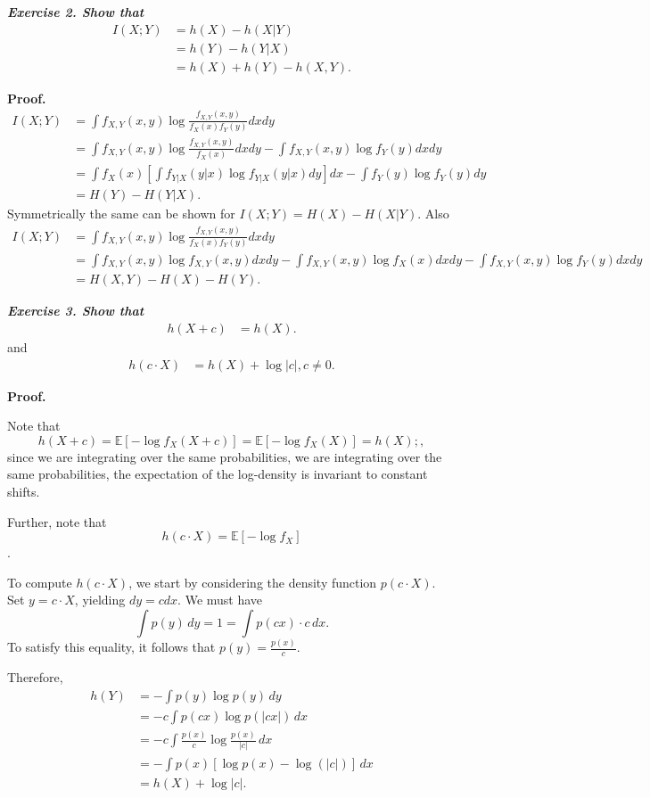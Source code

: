 \documentclass[12pt]{extarticle}
\begin{document}
\textbf{\textit{Exercise 2.   Show that}}
\begin{align*}
I(X; Y) &= h(X) - h(X | Y) \\
		&= h(Y) - h(Y | X) \\
        &= h(X) + h(Y) - h(X, Y).
\end{align*}

\textbf{Proof.}
\begin{align*}
I(X;Y)&=\int f_{X,Y}(x,y)\log\frac{f_{X,Y}(x,y)}{f_X(x)f_Y(y)}dxdy\\
&=\int f_{X,Y}(x,y)\log\frac{f_{X,Y}(x,y)}{f_X(x)}dxdy-\int f_{X,Y}(x,y)\log f_Y(y)dxdy\\
&=\int f_X(x) \left [ \int f_{Y|X}(y|x)\log f_{Y|X}(y|x)dy \right ] dx-\int f_{Y}(y)\log f_Y(y)dy\\
&=H(Y)-H(Y|X). 
\end{align*}
Symmetrically the same can be shown for $I(X;Y)=H(X)-H(X|Y).$ Also
\begin{align*}
I(X;Y)&=\int f_{X,Y}(x,y)\log\frac{f_{X,Y}(x,y)}{f_X(x)f_Y(y)}dxdy\\
&=\int f_{X,Y}(x,y)\log f_{X,Y}(x,y)dxdy-\int f_{X,Y}(x,y)\log f_X(x)dxdy-\int f_{X,Y}(x,y)\log f_Y(y)dxdy\\
&=H(X,Y)-H(X)-H(Y).
\end{align*}

\textbf{\textit{Exercise 3.   Show that}}
\begin{align*}
h(X + c) &= h(X).
\end{align*}
and
\begin{align*}
h(c \cdot X) &= h(X) + \log \lvert c\rvert, c\neq 0.
\end{align*}

\textbf{Proof.} 

Note that
\[
h(X+c) = \mathbb{E} [-\log f_X(X+c)] = \mathbb{E}[-\log f_X(X)] = h(X);,
\]
since we are integrating over the same probabilities, we are integrating over the same probabilities, the expectation of the log-density is invariant to constant shifts.

Further, note that
\[
h(c \cdot X) = \mathbb{E} [- \log f_X]
\].

To compute $h(c \cdot X)$, we start by considering the density function $p(c \cdot X)$.  Set $y = c \cdot X$, yielding $dy = c dx$.  We must have
\[
\int p(y) \, dy = 1 = \int p(cx) \cdot c \, dx.
\]
To satisfy this equality, it follows that  $p(y) = \frac{p(x)}{c}$.

Therefore,
\begin{align*}
h(Y) &= - \int p(y) \log p(y) \, dy \\
	 &= - c \int p(cx) \log p(|cx|) \, dx \\
     &= -c \int \frac{p(x)}{c} \log \frac{p(x)}{|c|} \, dx \\
     &= - \int p(x) [\log p(x) - \log(|c|)] \, dx \\
     &= h(X) + \log |c|.
\end{align*}
\end{document}
